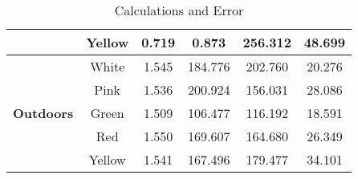\begin{table}[H]
\begin{tabular}{|c|c|c|c|c|c|}
		                                   & Yellow          & 0.719                                                      & 0.873                                                       & 256.312                                                                                 & 48.699                                                                                         \\ \hline
		\multirow{5}{*}{\textbf{Outdoors}} & White           & 1.545                                                      & 184.776                                                     & 202.760                                                                                 & 20.276                                                                                         \\ \cline{2-6}
		                                   & Pink            & 1.536                                                      & 200.924                                                     & 156.031                                                                                 & 28.086                                                                                         \\ \cline{2-6}
		                                   & Green           & 1.509                                                      & 106.477                                                     & 116.192                                                                                 & 18.591                                                                                         \\ \cline{2-6}
		                                   & Red             & 1.550                                                      & 169.607                                                     & 164.680                                                                                 & 26.349                                                                                         \\ \cline{2-6}
		                                   & Yellow          & 1.541                                                      & 167.496                                                     & 179.477                                                                                 & 34.101                                                                                         \\ \hline
	\end{tabular}
	\caption{Calculations and Error}
	\label{tab:3}
\end{table}